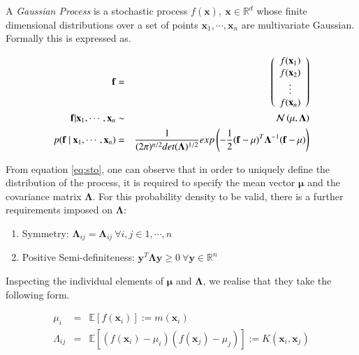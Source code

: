 \documentclass[referee,a4paper,12pt,traditabstract]{swsc}
\begin{document}
\begin{linenumbers}
A \emph{Gaussian Process} is a stochastic process $f(\mathbf{x}), \ \mathbf{x} \in \mathbb{R}^d$ whose finite dimensional distributions over a set of points $\mathbf{x}_1, \cdots, \mathbf{x}_n$ are multivariate Gaussian. Formally this is expressed as.

\begin{eqnarray}
 \mathbf{f} & = & \left( \begin{array}{c} f(\mathbf{x}_1) \\ f(\mathbf{x}_2) \\ \vdots \\ f(\mathbf{x}_n) \end{array} \right) \\
 \vspace{2\baselineskip}
 \mathbf{f} | \mathbf{x}_1, \cdots, \mathbf{x}_n & \sim & \mathcal{N}\left( \mathbf{\mu}, \mathbf{\Lambda} \right)  \\
 \vspace{2\baselineskip}
 p( \mathbf{f} \ | \ \mathbf{x}_1, \cdots, \mathbf{x}_n) & = & \frac{1}{(2\pi)^{n/2} det(\mathbf{\Lambda})^{1/2}} exp \left(-\frac{1}{2} (\mathbf{f} - \mathbf{\mu})^T \mathbf{\Lambda}^{-1} (\mathbf{f} - \mathbf{\mu}) \right) \label{eq:sto}
\end{eqnarray}

From equation \ref{eq:sto}, one can observe that in order to uniquely define the distribution of the process, it is required to specify the mean vector $\mathbf{\mu}$ and the covariance matrix $\mathbf{\Lambda}$. For this probability density to be valid, there is a further requirements imposed on $\mathbf{\Lambda}$: 

\begin{enumerate}
      \item Symmetry: $\mathbf{\Lambda}_{ij} = \mathbf{\Lambda}_{ij} \ \forall i,j \in {1, \cdots, n} $ 
      \item Positive Semi-definiteness: $\mathbf{y}^T \mathbf{\Lambda} \mathbf{y} \geq 0 \ \forall \mathbf{y} \in \mathbb{R}^n$  
\end{enumerate}

Inspecting the individual elements of $\mathbf{\mu}$ and $\mathbf{\Lambda}$, we realise that they take the following form.

\begin{eqnarray}
      \mu_i & = & \mathbb{E}[f(\mathbf{x}_i)] := m(\mathbf{x}_i) \\
      \Lambda_{ij} & = & \mathbb{E}[(f(\mathbf{x}_i) - \mu_i)(f(\mathbf{x}_j) - \mu_j)] := K(\mathbf{x}_i, \mathbf{x}_j)
\end{eqnarray}


\end{linenumbers}
\end{document}
